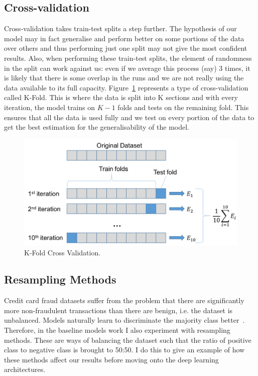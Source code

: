 \documentclass[12pt,a4paper,twoside]{report}
\begin{document}
\subsection{Cross-validation}

Cross-validation takes train-test splits a step further. The hypothesis of our model may in fact generalise and perform better on some portions of the data over others and thus performing just one split may not give the most confident results. Also, when performing these train-test splits, the element of randomness in the split can work against us: even if we average this process (say) 3 times, it is likely that there is some overlap in the runs and we are not really using the data available to its full capacity. Figure~\ref{fig:k-fold-cross-val} represents a type of cross-validation called K-Fold. This is where the data is split into K sections and with every iteration, the model trains on $K-1$ folds and tests on the remaining fold. This ensures that all the data is used fully and we test on every portion of the data to get the best estimation for the generalisability of the model.

\begin{figure}[!htbp]

\centering
\includegraphics[scale=0.8]{cross-val}
\caption{K-Fold Cross Validation.}
\label{fig:k-fold-cross-val}
\end{figure}

\subsection{Resampling Methods}

Credit card fraud datasets suffer from the problem that there are significantly more non-fraudulent transactions than there are benign, i.e. the dataset is unbalanced. Models naturally learn to discriminate the majority class better~\cite{Japkowicz00theclass}. Therefore, in the baseline models work I also experiment with resampling methods.
These are ways of balancing the dataset such that the ratio of positive class to negative class is brought to 50:50. I do this to give an example of how these methods affect our results before moving onto the deep learning architectures. 
\end{document}
